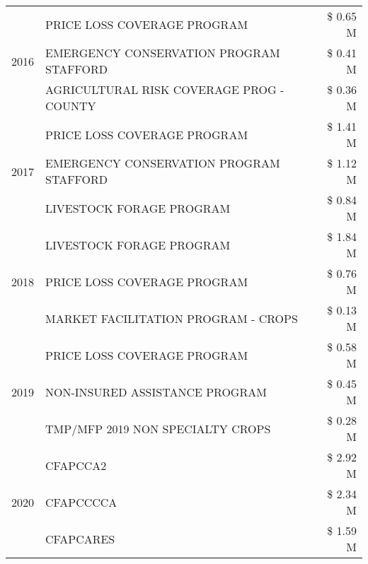 \begin{tabular}{llr}
\cline{1-3}
\multirow[t]{3}{*}{2016} & PRICE LOSS COVERAGE PROGRAM & \$ 0.65 M \\
 & EMERGENCY CONSERVATION PROGRAM STAFFORD & \$ 0.41 M \\
 & AGRICULTURAL RISK COVERAGE PROG - COUNTY & \$ 0.36 M \\
\cline{1-3}
\multirow[t]{3}{*}{2017} & PRICE LOSS COVERAGE PROGRAM & \$ 1.41 M \\
 & EMERGENCY CONSERVATION PROGRAM STAFFORD & \$ 1.12 M \\
 & LIVESTOCK FORAGE PROGRAM & \$ 0.84 M \\
\cline{1-3}
\multirow[t]{3}{*}{2018} & LIVESTOCK FORAGE PROGRAM & \$ 1.84 M \\
 & PRICE LOSS COVERAGE PROGRAM & \$ 0.76 M \\
 & MARKET FACILITATION PROGRAM - CROPS & \$ 0.13 M \\
\cline{1-3}
\multirow[t]{3}{*}{2019} & PRICE LOSS COVERAGE PROGRAM & \$ 0.58 M \\
 & NON-INSURED ASSISTANCE PROGRAM & \$ 0.45 M \\
 & TMP/MFP 2019 NON SPECIALTY CROPS & \$ 0.28 M \\
\cline{1-3}
\multirow[t]{3}{*}{2020} & CFAPCCA2 & \$ 2.92 M \\
 & CFAPCCCCA & \$ 2.34 M \\
 & CFAPCARES & \$ 1.59 M \\
\cline{1-3}
\bottomrule
\end{tabular}
